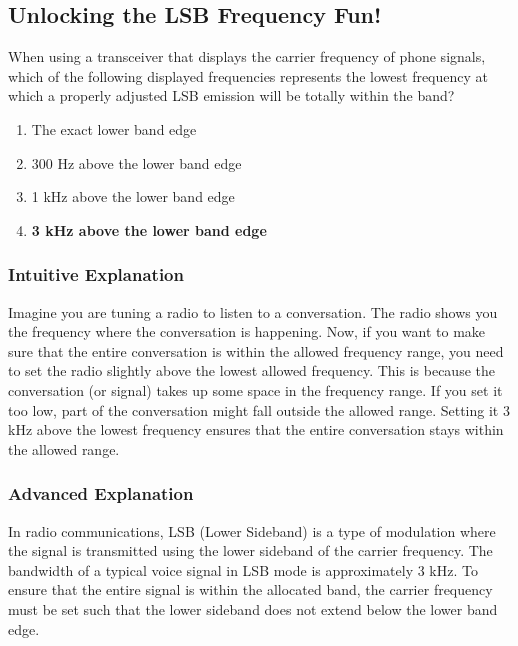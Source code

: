 \subsection{Unlocking the LSB Frequency Fun!}

\begin{tcolorbox}[colback=gray!10!white,colframe=black!75!black,title=E1A02] When using a transceiver that displays the carrier frequency of phone signals, which of the following displayed frequencies represents the lowest frequency at which a properly adjusted LSB emission will be totally within the band?
    \begin{enumerate}[label=\Alph*.]
        \item The exact lower band edge
        \item 300 Hz above the lower band edge
        \item 1 kHz above the lower band edge
        \item \textbf{3 kHz above the lower band edge}
    \end{enumerate}
\end{tcolorbox}

\subsubsection{Intuitive Explanation}
Imagine you are tuning a radio to listen to a conversation. The radio shows you the frequency where the conversation is happening. Now, if you want to make sure that the entire conversation is within the allowed frequency range, you need to set the radio slightly above the lowest allowed frequency. This is because the conversation (or signal) takes up some space in the frequency range. If you set it too low, part of the conversation might fall outside the allowed range. Setting it 3 kHz above the lowest frequency ensures that the entire conversation stays within the allowed range.

\subsubsection{Advanced Explanation}
In radio communications, LSB (Lower Sideband) is a type of modulation where the signal is transmitted using the lower sideband of the carrier frequency. The bandwidth of a typical voice signal in LSB mode is approximately 3 kHz. To ensure that the entire signal is within the allocated band, the carrier frequency must be set such that the lower sideband does not extend below the lower band edge.

